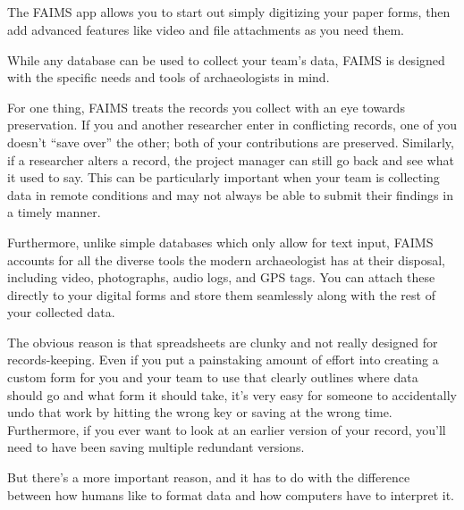 \subsection[section]{{}}

The FAIMS app allows you to start out simply digitizing your paper forms, then add advanced features like video and file attachments as you need them.


While any database can be used to collect your team's data, FAIMS is designed with the specific needs and tools of archaeologists in mind.

For one thing, FAIMS treats the records you collect with an eye towards preservation. If you and another researcher enter in conflicting records, one of you doesn't “save over” the other; both of your contributions are preserved. Similarly, if a researcher alters a record, the project manager can still go back and see what it used to say. This can be particularly important when your team is collecting data in remote conditions and may not always be able to submit their findings in a timely manner.

Furthermore, unlike simple databases which only allow for text input, FAIMS accounts for all the diverse tools the modern archaeologist has at their disposal, including video, photographs, audio logs, and GPS tags. You can attach these directly to your digital forms and store them seamlessly along with the rest of your collected data.


The obvious reason is that spreadsheets are clunky and not really designed for records-keeping. Even if you put a painstaking amount of effort into creating a custom form for you and your team to use that clearly outlines where data should go and what form it should take, it's very easy for someone to accidentally undo that work by hitting the wrong key or saving at the wrong time. Furthermore, if you ever want to look at an earlier version of your record, you'll need to have been saving multiple redundant versions.

But there's a more important reason, and it has to do with the difference between how humans like to format data and how computers have to interpret it.

